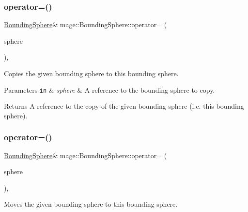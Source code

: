 \subsubsection{\texorpdfstring{operator=()}{operator=()}\hspace{0.1cm}{\footnotesize\ttfamily [1/2]}}
{\footnotesize\ttfamily \hyperlink{classmage_1_1_bounding_sphere}{Bounding\+Sphere}\& mage\+::\+Bounding\+Sphere\+::operator= (\begin{DoxyParamCaption}\item[{const \hyperlink{classmage_1_1_bounding_sphere}{Bounding\+Sphere} \&}]{sphere }\end{DoxyParamCaption})\hspace{0.3cm}{\ttfamily [default]}, {\ttfamily [noexcept]}}

Copies the given bounding sphere to this bounding sphere.


\begin{DoxyParams}[1]{Parameters}
\mbox{\tt in}  & {\em sphere} & A reference to the bounding sphere to copy. \\
\hline
\end{DoxyParams}
\begin{DoxyReturn}{Returns}
A reference to the copy of the given bounding sphere (i.\+e. this bounding sphere). 
\end{DoxyReturn}
\hypertarget{classmage_1_1_bounding_sphere_a2a0e22660b37c54bb0e2e76efc198281}{}\label{classmage_1_1_bounding_sphere_a2a0e22660b37c54bb0e2e76efc198281} 
\subsubsection{\texorpdfstring{operator=()}{operator=()}\hspace{0.1cm}{\footnotesize\ttfamily [2/2]}}
{\footnotesize\ttfamily \hyperlink{classmage_1_1_bounding_sphere}{Bounding\+Sphere}\& mage\+::\+Bounding\+Sphere\+::operator= (\begin{DoxyParamCaption}\item[{\hyperlink{classmage_1_1_bounding_sphere}{Bounding\+Sphere} \&\&}]{sphere }\end{DoxyParamCaption})\hspace{0.3cm}{\ttfamily [default]}, {\ttfamily [noexcept]}}

Moves the given bounding sphere to this bounding sphere.


